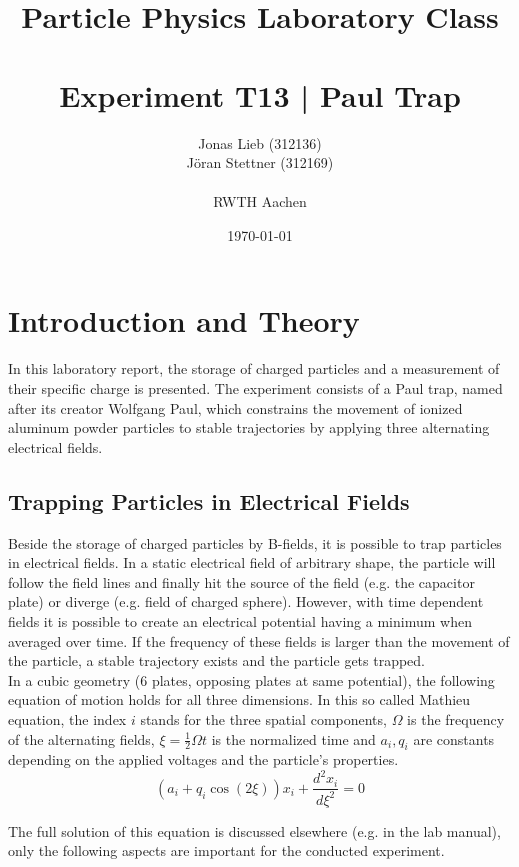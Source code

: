 \documentclass[
	paper=A4,
	parskip=full,
	chapterprefix=true,
	11pt,
	headings=normal,
	bibliography=totoc,
	listof=totoc,
	titlepage=on,
]{scrreprt}
\date{\today}
\title{Particle Physics Laboratory Class \\ \quad \\ Experiment T13 | Paul Trap }
\author{Jonas Lieb (312136) \\ Jöran Stettner (312169) \\ \\  RWTH Aachen}
\begin{document}
\maketitle

\cleardoublepage

\setcounter{tocdepth}{2}
\tableofcontents

\cleardoublepage

\chapter{Introduction and Theory}

In this laboratory report, the storage of charged particles and a measurement of their specific charge is presented. The experiment consists of a Paul trap, named after its creator Wolfgang Paul, which constrains the movement of ionized aluminum powder particles to stable trajectories by applying three alternating electrical fields. 

\section{Trapping Particles in Electrical Fields}

Beside the storage of charged particles by B-fields, it is possible to trap particles in electrical fields. In a static electrical field of arbitrary shape, the particle will follow the field lines and finally hit the source of the field (e.g. the capacitor plate) or diverge (e.g. field of charged sphere). However, with time dependent fields it is possible to create an electrical potential having a minimum when averaged over time. If the frequency of these fields is larger than the movement of the particle, a stable trajectory exists and the particle gets trapped. \\

In a cubic geometry (6 plates, opposing plates at same potential), the following equation of motion holds for all three dimensions. In this so called Mathieu equation, the index $i$ stands for the three spatial components, $\Omega$ is the frequency of the alternating fields, $\xi = \frac{1}{2} \Omega t$ is the normalized time and $a_i, q_i$ are constants depending on the applied voltages and the particle's properties.
\begin{equation}
\label{eq:mathieu}
\left(a_i+q_i \cos(2 \xi)\right) x_i + \frac{d^2x_i}{d\xi^2} = 0
\end{equation}

The full solution of this equation is discussed elsewhere (e.g. in the lab manual\cite{Lab_manual}), only the following aspects are important for the conducted experiment.
\end{document}
